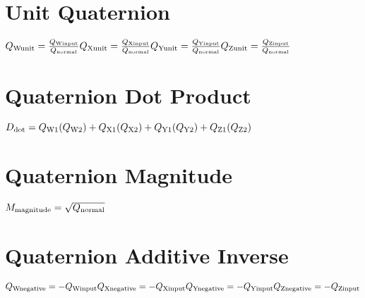 \documentclass{article}
\begin{document}
\section{Unit Quaternion}
\begin{linenomath}
\begin{center}
$
Q_\textrm{Wunit} =  \frac{Q_\textrm{Winput}}{Q_\textrm{normal}}\newline
Q_\textrm{Xunit} =  \frac{Q_\textrm{Xinput}}{Q_\textrm{normal}}\newline
Q_\textrm{Yunit} = \frac{Q_\textrm{Yinput}}{Q_\textrm{normal}}\newline
Q_\textrm{Zunit} =  \frac{Q_\textrm{Zinput}}{Q_\textrm{normal}}\newline
$
\end{center}
\end{linenomath}

\section{Quaternion Dot Product}
\begin{linenomath}
\begin{center}
$
D_\textrm{dot} = Q_\textrm{W1}(Q_\textrm{W2}) + Q_\textrm{X1}(Q_\textrm{X2}) + Q_\textrm{Y1}(Q_\textrm{Y2}) + Q_\textrm{Z1}(Q_\textrm{Z2}) \newline
$
\end{center}
\end{linenomath}

\section{Quaternion Magnitude}
\begin{linenomath}
\begin{center}
$
M_\textrm{magnitude} = \sqrt{Q_\textrm{normal}} \newline
$
\end{center}
\end{linenomath}

\section{Quaternion Additive Inverse}
\begin{linenomath}
\begin{center}
$
Q_\textrm{Wnegative} =  -Q_\textrm{Winput} \newline
Q_\textrm{Xnegative} =  -Q_\textrm{Xinput} \newline
Q_\textrm{Ynegative} =  -Q_\textrm{Yinput} \newline
Q_\textrm{Znegative} =  -Q_\textrm{Zinput} \newline
$
\end{center}
\end{linenomath}
\end{document}
